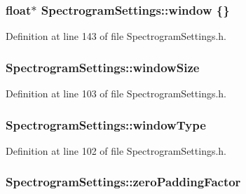 \subsubsection[{\texorpdfstring{window}{window}}]{\setlength{\rightskip}{0pt plus 5cm}float$\ast$ Spectrogram\+Settings\+::window \{\}\hspace{0.3cm}{\ttfamily [mutable]}}\hypertarget{class_spectrogram_settings_a1fdc24b77ae72f754274825cee5e288f}{}\label{class_spectrogram_settings_a1fdc24b77ae72f754274825cee5e288f}


Definition at line 143 of file Spectrogram\+Settings.\+h.

\subsubsection[{\texorpdfstring{window\+Size}{windowSize}}]{ Spectrogram\+Settings\+::window\+Size}\hypertarget{class_spectrogram_settings_afbb300bf82421e6d50cb81b7032f7529}{}\label{class_spectrogram_settings_afbb300bf82421e6d50cb81b7032f7529}


Definition at line 103 of file Spectrogram\+Settings.\+h.

\subsubsection[{\texorpdfstring{window\+Type}{windowType}}]{ Spectrogram\+Settings\+::window\+Type}\hypertarget{class_spectrogram_settings_a7fbea69cb9478dd7d894d9399561c736}{}\label{class_spectrogram_settings_a7fbea69cb9478dd7d894d9399561c736}


Definition at line 102 of file Spectrogram\+Settings.\+h.

\subsubsection[{\texorpdfstring{zero\+Padding\+Factor}{zeroPaddingFactor}}]{ Spectrogram\+Settings\+::zero\+Padding\+Factor}\hypertarget{class_spectrogram_settings_ae627610702531c18a358f3df459027e8}{}\label{class_spectrogram_settings_ae627610702531c18a358f3df459027e8}


